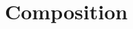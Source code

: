 \section{Composition}

  \begin{definition}
    
  \end{definition}

  \begin{definition}[Delegation]
    
  \end{definition}

